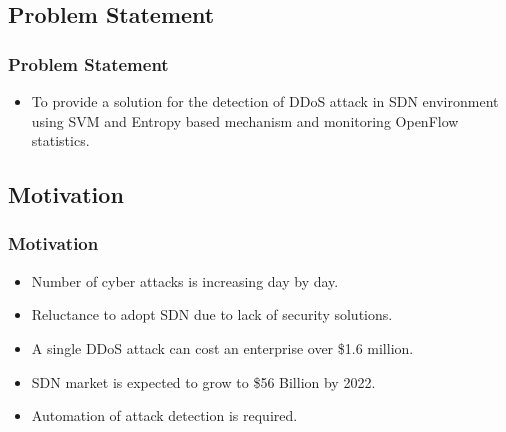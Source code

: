 \documentclass[10pt]{beamer}
\begin{document}
\begin{frame}
\section[]{Problem Statement}
\frametitle{Problem Statement}
\begin{itemize}
\footnotesize
\item
To provide a solution for the detection of DDoS attack in SDN environment using SVM and Entropy based mechanism and monitoring OpenFlow statistics.
\end{itemize}
\end{frame}




\begin{frame}
\section[]{Motivation}
\frametitle{Motivation}
\begin{center}
\begin{itemize}
\footnotesize
\item 
Number of cyber attacks is increasing day by day.
\item
Reluctance to adopt SDN due to lack of security solutions.
\item
A single DDoS attack can cost an enterprise over \$1.6 million.
\item
SDN market is expected to grow to \$56 Billion by 2022.
\item
Automation of attack detection is required.
 
\end{itemize}
\end{center}

\end{frame}
\end{document}
